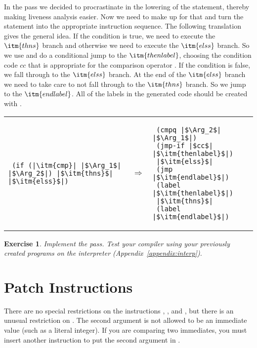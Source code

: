 \documentclass[11pt]{book}
\newtheorem{exercise}[theorem]{Exercise}
\begin{document}
In the  pass we decided to procrastinate in
the lowering of the  statement, thereby making liveness
analysis easier. Now we need to make up for that and turn the 
statement into the appropriate instruction sequence.  The following
translation gives the general idea. If the condition is true, we need
to execute the $\itm{thns}$ branch and otherwise we need to execute
the $\itm{elss}$ branch. So we use  and do a conditional
jump to the $\itm{thenlabel}$, choosing the condition code $cc$ that
is appropriate for the comparison operator .  If the
condition is false, we fall through to the $\itm{elss}$ branch. At the
end of the $\itm{elss}$ branch we need to take care to not fall
through to the $\itm{thns}$ branch. So we jump to the
$\itm{endlabel}$. All of the labels in the generated code should be
created with .

\begin{tabular}{lll}
\begin{minipage}{0.4\textwidth}
\begin{lstlisting}
 (if (|\itm{cmp}| |$\Arg_1$| |$\Arg_2$|) |$\itm{thns}$| |$\itm{elss}$|)
\end{lstlisting}
\end{minipage}
&
$\Rightarrow$
&
\begin{minipage}{0.4\textwidth}
\begin{lstlisting}
 (cmpq |$\Arg_2$| |$\Arg_1$|)
 (jmp-if |$cc$| |$\itm{thenlabel}$|)
 |$\itm{elss}$|
 (jmp |$\itm{endlabel}$|)
 (label |$\itm{thenlabel}$|)
 |$\itm{thns}$|
 (label |$\itm{endlabel}$|)
\end{lstlisting}
\end{minipage}
\end{tabular}

\begin{exercise}\normalfont
Implement the  pass. Test your compiler using
your previously created programs on the  interpreter
(Appendix~\ref{appendix:interp}).
\end{exercise}

\section{Patch Instructions}

There are no special restrictions on the instructions ,
, and , but there is an unusual restriction on
. The second argument is not allowed to be an immediate
value (such as a literal integer). If you are comparing two
immediates, you must insert another  instruction to put the
second argument in .
\end{document}
